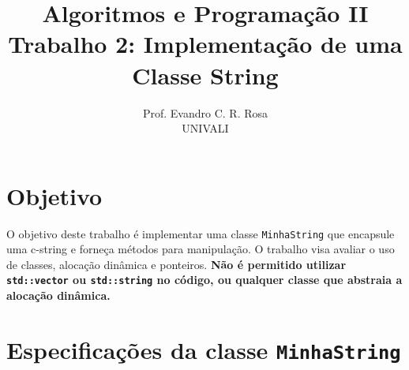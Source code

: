 \documentclass[12pt]{article}
\title{Algoritmos e Programação II\\
\large Trabalho 2: Implementação de uma Classe String}
\author{Prof. Evandro C. R. Rosa\\UNIVALI}
\date{}
\begin{document}
\maketitle


\section*{Objetivo}
O objetivo deste trabalho é implementar uma classe \texttt{MinhaString} que encapsule uma c-string e forneça métodos para manipulação. O trabalho visa avaliar o uso de classes, alocação dinâmica e ponteiros. \textbf{Não é permitido utilizar \texttt{std::vector} ou \texttt{std::string} no código, ou qualquer classe que abstraia a alocação dinâmica.}

\section*{Especificações da classe \texttt{MinhaString}}
\end{document}
